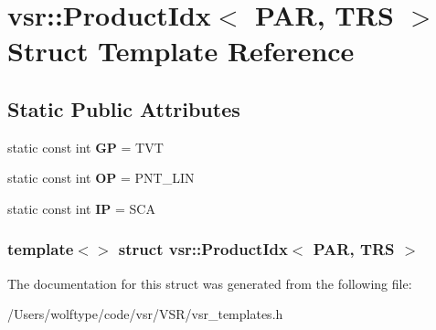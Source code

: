\hypertarget{structvsr_1_1_product_idx_3_01_p_a_r_00_01_t_r_s_01_4}{\section{vsr\-:\-:Product\-Idx$<$ P\-A\-R, T\-R\-S $>$ Struct Template Reference}
\label{structvsr_1_1_product_idx_3_01_p_a_r_00_01_t_r_s_01_4}
}
\subsection*{Static Public Attributes}
\begin{DoxyCompactItemize}
\item 
\hypertarget{structvsr_1_1_product_idx_3_01_p_a_r_00_01_t_r_s_01_4_a6f8222440b29964777e1429658461084}{static const int {\bfseries G\-P} = T\-V\-T}\label{structvsr_1_1_product_idx_3_01_p_a_r_00_01_t_r_s_01_4_a6f8222440b29964777e1429658461084}

\item 
\hypertarget{structvsr_1_1_product_idx_3_01_p_a_r_00_01_t_r_s_01_4_ae41dc188d773f2b1c474c3b62064d731}{static const int {\bfseries O\-P} = P\-N\-T\-\_\-\-L\-I\-N}\label{structvsr_1_1_product_idx_3_01_p_a_r_00_01_t_r_s_01_4_ae41dc188d773f2b1c474c3b62064d731}

\item 
\hypertarget{structvsr_1_1_product_idx_3_01_p_a_r_00_01_t_r_s_01_4_a8623136cc6762f131fc6c1d997238edd}{static const int {\bfseries I\-P} = S\-C\-A}\label{structvsr_1_1_product_idx_3_01_p_a_r_00_01_t_r_s_01_4_a8623136cc6762f131fc6c1d997238edd}

\end{DoxyCompactItemize}
\subsubsection*{template$<$$>$ struct vsr\-::\-Product\-Idx$<$ P\-A\-R, T\-R\-S $>$}



The documentation for this struct was generated from the following file\-:\begin{DoxyCompactItemize}
\item 
/\-Users/wolftype/code/vsr/\-V\-S\-R/vsr\-\_\-templates.\-h\end{DoxyCompactItemize}
